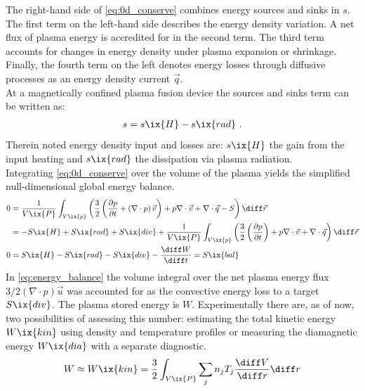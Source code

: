 %
            The right-hand side of \cref{eq:0d_conserve} combines energy sources and sinks in $s$. The first term on the left-hand side describes the energy density variation. A net flux of plasma energy is accredited for in the second term. The third term accounts for changes in energy density under plasma expansion or shrinkage. Finally, the fourth term on the left denotes energy losses through diffusive processes as an energy density current $\vec{q}$.\\%
            At a magnetically confined plasma fusion device the sources and sinks term can be written as\cite{Bozhenkov2016}:%
%
            \begin{align}%
                s=s\ix{H}-s\ix{rad}\,\,.\nonumber%
            \end{align}%
%
            Therein noted energy density input and losses are: $s\ix{H}$ the gain from the input heating and $s\ix{rad}$ the dissipation via plasma radiation.\\%
            Integrating \cref{eq:0d_conserve} over the volume of the plasma yields the simplified null-dimensional global energy balance.%
%
            \begin{align}%
                0&=\frac{1}{V\ix{P}}\int_{V\ix{p}}\left(\frac{3}{2}\left(\frac{\partial p}{\partial t}+\left(\nabla\cdot p\right)\vec{v}\right)+p\nabla\cdot\vec{v}+\nabla\cdot\vec{q}-S\right)\diff\vec{r}\nonumber\\%
                &=-S\ix{H}+S\ix{rad}+S\ix{div}+\frac{1}{V\ix{P}}\int_{V\ix{p}}\left(\frac{3}{2}\left(\frac{\partial p}{\partial t}\right)+p\nabla\cdot\vec{v}+\nabla\cdot\vec{q}\right)\diff\vec{r}\nonumber\\%
                0&=S\ix{H}-S\ix{rad}-S\ix{div}-\frac{\diff W}{\diff t}=S\ix{bal}\label{eq:energy_balance}%
            \end{align}%
%
            In \cref{eq:energy_balance} the volume integral over the net plasma energy flux $3/2\left(\nabla\cdot p\right)\vec{u}$ was accounted for as the convective energy loss to a target $S\ix{div}$. The plasma stored energy is $W$. Experimentally there are, as of now, two possibilities of assessing this number: estimating the total kinetic energy $W\ix{kin}$ using density and temperature profiles or measuring the diamagnetic energy $W\ix{dia}$ with a separate diagnostic.
%
            \begin{align}%
                W\approx W\ix{kin}=\frac{3}{2}\int_{V\ix{P}}\sum_{j}n_{j}T_{j}\frac{\diff V}{\diff r}\diff r\nonumber%
            \end{align}%
